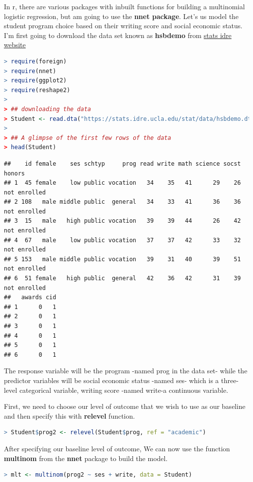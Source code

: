 \documentclass[
]{article}
\begin{document}
In r, there are various packages with inbuilt functions for building a
multinomial logistic regression, but am going to use the \textbf{nnet
package}. Let's us model the student program choice based on their
writing score and social economic status. I'm first going to download
the data set known as \textbf{hsbdemo} from
\href{https://stats.idre.ucla.edu}{stats idre website}

\begin{lstlisting}[language=R]
> require(foreign)
> require(nnet)
> require(ggplot2)
> require(reshape2)
> 
> ## downloading the data
> Student <- read.dta("https://stats.idre.ucla.edu/stat/data/hsbdemo.dta")
> 
> ## A glimpse of the first few rows of the data
> head(Student)
\end{lstlisting}

\begin{lstlisting}
##    id female    ses schtyp     prog read write math science socst       honors
## 1  45 female    low public vocation   34    35   41      29    26 not enrolled
## 2 108   male middle public  general   34    33   41      36    36 not enrolled
## 3  15   male   high public vocation   39    39   44      26    42 not enrolled
## 4  67   male    low public vocation   37    37   42      33    32 not enrolled
## 5 153   male middle public vocation   39    31   40      39    51 not enrolled
## 6  51 female   high public  general   42    36   42      31    39 not enrolled
##   awards cid
## 1      0   1
## 2      0   1
## 3      0   1
## 4      0   1
## 5      0   1
## 6      0   1
\end{lstlisting}

The response variable will be the program -named prog in the data set-
while the predictor variables will be social economic status -named ses-
which is a three-level categorical variable, writing score -named
write-a continuous variable.

First, we need to choose our level of outcome that we wish to use as our
baseline and then specify this with \textbf{relevel} function.

\begin{lstlisting}[language=R]
> Student$prog2 <- relevel(Student$prog, ref = "academic")
\end{lstlisting}

After specifying our baseline level of outcome, We can now use the
function \textbf{multinom} from the \textbf{nnet} package to build the
model.

\begin{lstlisting}[language=R]
> mlt <- multinom(prog2 ~ ses + write, data = Student)
\end{lstlisting}
\end{document}
